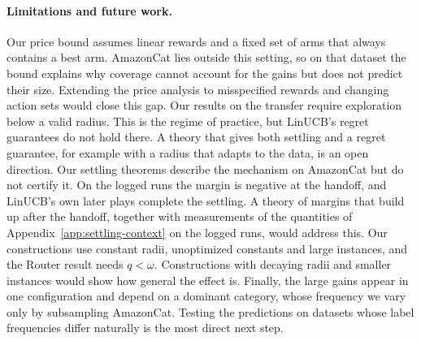 \documentclass[anon]{alt2027} %
\newif\ifrevmarks\revmarkstrue
\newenvironment{revised}{\ifrevmarks\color{revcolor}\fi}{}
\begin{document}
\begin{revised}
\paragraph{Limitations and future work.}
Our price bound assumes linear rewards and a fixed set of arms that always
contains a best arm. AmazonCat lies outside this setting, so on that dataset
the bound explains why coverage cannot account for the gains but does not
predict their size. Extending the price analysis to misspecified rewards and
changing action sets would close this gap. Our results on the transfer
require exploration below a valid radius. This is the regime of practice,
but LinUCB's regret guarantees do not hold there. A theory that gives both
settling and a regret guarantee, for example with a radius that adapts to
the data, is an open direction. Our settling theorems describe the mechanism
on AmazonCat but do not certify it. On the logged runs the margin is
negative at the handoff, and LinUCB's own later plays complete the settling.
A theory of margins that build up after the handoff, together with
measurements of the quantities of Appendix~\ref{app:settling-context} on the
logged runs, would address this. Our constructions use constant radii,
unoptimized constants and large instances, and the Router result needs
$q<\omega$. Constructions with decaying radii and smaller instances would
show how general the effect is. Finally, the large gains appear in one
configuration and depend on a dominant category, whose frequency we vary
only by subsampling AmazonCat. Testing the predictions on datasets whose
label frequencies differ naturally is the most direct next step.
\end{revised}





\appendix
\end{document}
